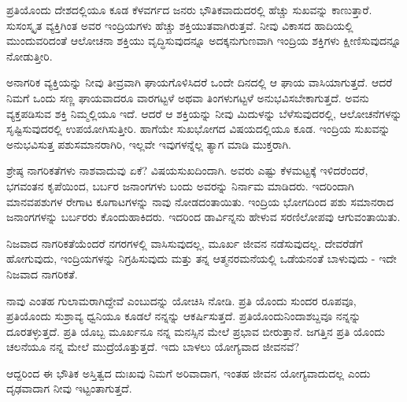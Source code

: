 ಪ್ರತಿಯೊಂದು ದೇಶದಲ್ಲಿಯೂ ಕೂಡ ಕೆಳವರ್ಗದ ಜನರು ಭೌತಿಕವಾದುದರಲ್ಲಿ ಹೆಚ್ಚು ಸುಖವನ್ನು ಕಾಣುತ್ತಾರೆ. ಸುಸಂಸ್ಕೃತ ವ್ಯಕ್ತಿಗಿಂತ ಅವರ ಇಂದ್ರಿಯಗಳು ಹೆಚ್ಚು ಶಕ್ತಿಯುತವಾಗಿರುತ್ತವೆ. ನೀವು ವಿಕಾಸದ ಹಾದಿಯಲ್ಲಿ ಮುಂದುವರಿದಂತೆ ಆಲೋಚನಾ ಶಕ್ತಿಯು ವೃದ್ಧಿಸುವುದನ್ನೂ ಅದಕ್ಕನುಗುಣವಾಗಿ ಇಂದ್ರಿಯ ಶಕ್ತಿಗಳು ಕ್ಷೀಣಿಸುವುದನ್ನೂ ನೋಡುತ್ತೀರಿ.

ಅನಾಗರಿಕ ವ್ಯಕ್ತಿಯನ್ನು ನೀವು ತೀವ್ರವಾಗಿ ಘಾಯಗೊಳಿಸಿದರೆ ಒಂದೇ ದಿನದಲ್ಲಿ ಆ ಘಾಯ ವಾಸಿಯಾಗುತ್ತದೆ. ಆದರೆ ನಿಮಗೆ ಒಂದು ಸಣ್ಣ ಘಾಯವಾದರೂ ವಾರಗಟ್ಟಳೆ ಅಥವಾ ತಿಂಗಳುಗಟ್ಟಳೆ ಅನುಭವಿಸಬೇಕಾಗುತ್ತದೆ. ಅವನು ವ್ಯಕ್ತಪಡಿಸುವ ಶಕ್ತಿ ನಿಮ್ಮಲ್ಲಿಯೂ ಇದೆ. ಆದರೆ ಆ ಶಕ್ತಿಯನ್ನು ನೀವು ಮಿದುಳನ್ನು ಬೆಳೆಸುವುದರಲ್ಲಿ, ಆಲೋಚನೆಗಳನ್ನು ಸೃಷ್ಟಿಸುವುದರಲ್ಲಿ ಉಪಯೋಗಿಸುತ್ತೀರಿ. ಹಾಗೆಯೇ ಸುಖಭೋಗದ ವಿಷಯದಲ್ಲಿಯೂ ಕೂಡ. ಇಂದ್ರಿಯ ಸುಖವನ್ನು ಅನುಭವಿಸುತ್ತ ಪಶುಸಮಾನರಾಗಿರಿ, ಇಲ್ಲವೇ ಇವುಗಳನ್ನೆಲ್ಲ ತ್ಯಾಗ ಮಾಡಿ ಮುಕ್ತರಾಗಿ.

ಶ್ರೇಷ್ಠ ನಾಗರಿಕತೆಗಳು ನಾಶವಾದುವು ಏಕೆ? ವಿಷಯಸುಖದಿಂದಾಗಿ. ಅವರು ಎಷ್ಟು ಕೆಳಮಟ್ಟಕ್ಕೆ ಇಳಿದರೆಂದರೆ, ಭಗವಂತನ ಕೃಪೆಯಿಂದ, ಬರ್ಬರ ಜನಾಂಗಗಳು ಬಂದು ಅವರನ್ನು ನಿರ್ನಾಮ ಮಾಡಿದರು. ಇದರಿಂದಾಗಿ ಮಾನವಪಶುಗಳ ರೇಗಾಟ ಕೂಗಾಟಗಳನ್ನು ನಾವು ನೋಡದಂತಾಯಿತು. ಇಂದ್ರಿಯ ಭೋಗದಿಂದ ಪಶು ಸಮಾನರಾದ ಜನಾಂಗಗಳನ್ನು ಬರ್ಬರರು ಕೊಂದುಹಾಕಿದರು. ಇದರಿಂದ ಡಾರ್ವಿನ್ನನು ಹೇಳುವ ಸರಣಿಲೋಪವು ಆಗುವಂತಾಯಿತು.

ನಿಜವಾದ ನಾಗರಿಕತೆಯೆಂದರೆ ನಗರಗಳಲ್ಲಿ ವಾಸಿಸುವುದಲ್ಲ, ಮೂರ್ಖ ಜೀವನ ನಡೆಸುವುದಲ್ಲ. ದೇವರೆಡೆಗೆ ಹೋಗುವುದು, ಇಂದ್ರಿಯಗಳನ್ನು ನಿಗ್ರಹಿಸುವುದು ಮತ್ತು ತನ್ನ ಆತ್ಮನರಮನೆಯಲ್ಲಿ ಒಡೆಯನಂತೆ ಬಾಳುವುದು - ಇದೇ ನಿಜವಾದ ನಾಗರಿಕತೆ.

ನಾವು ಎಂತಹ ಗುಲಾಮರಾಗಿದ್ದೇವೆ ಎಂಬುದನ್ನು ಯೋಚಿಸಿ ನೋಡಿ. ಪ್ರತಿ ಯೊಂದು ಸುಂದರ ರೂಪವೂ, ಪ್ರತಿಯೊಂದು ಸುಶ್ರಾವ್ಯ ಧ್ವನಿಯೂ ಕೂಡಲೆ ನನ್ನನ್ನು ಆಕರ್ಷಿಸುತ್ತದೆ. ಪ್ರತಿಯೊಂದುನಿಂದಾಶಬ್ದವೂ ನನ್ನನ್ನು ದೂರತಳ್ಳುತ್ತದೆ. ಪ್ರತಿ ಯೊಬ್ಬ ಮೂರ್ಖನೂ ನನ್ನ ಮನಸ್ಸಿನ ಮೇಲೆ ಪ್ರಭಾವ ಬೀರುತ್ತಾನೆ. ಜಗತ್ತಿನ ಪ್ರತಿ ಯೊಂದು ಚಲನೆಯೂ ನನ್ನ ಮೇಲೆ ಮುದ್ರೆಯೊತ್ತುತ್ತದೆ. ಇದು ಬಾಳಲು ಯೋಗ್ಯವಾದ ಜೀವನವೆ?

ಆದ್ದರಿಂದ ಈ ಭೌತಿಕ ಅಸ್ತಿತ್ವದ ದುಃಖವು ನಿಮಗೆ ಅರಿವಾದಾಗ, ಇಂತಹ ಜೀವನ ಯೋಗ್ಯವಾದುದಲ್ಲ ಎಂದು ದೃಢವಾದಾಗ ನೀವು ಇಟ್ಟಂತಾಗುತ್ತದೆ.

